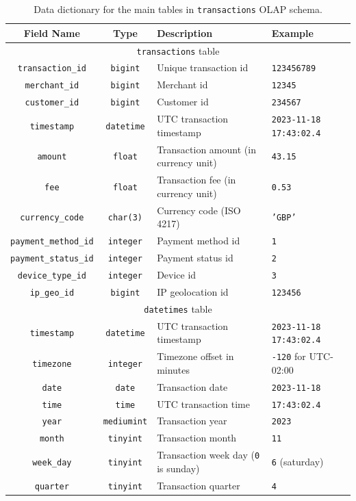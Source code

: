 \documentclass[11pt,a4paper,computermodern]{article}
\newcommand{\code}{\texttt}
\begin{document}
\begin{table}[ht]
	\centering
	\begin{threeparttable}
		\caption{Data dictionary for the main tables in \code{transactions} OLAP schema.}
		\label{table:OLAP_main}
		\begin{tabularx}{0.99\textwidth}{c c >{\centering\arraybackslash}X >{\centering\arraybackslash}X}
			\toprule
			Field Name & Type & Description & Example  \\
			\midrule
			\multicolumn{4}{c}{\code{transactions} table}\\
			\code{transaction\_id} & \code{bigint} & Unique transaction id & \code{123456789} \\
			\code{merchant\_id} & \code{bigint} & Merchant id & \code{12345} \\
			\code{customer\_id} & \code{bigint} & Customer id & \code{234567} \\
			\code{timestamp} & \code{datetime} & UTC transaction timestamp & \code{2023-11-18 17:43:02.4} \\
			\code{amount} & \code{float} & Transaction amount (in currency unit) & \code{43.15} \\
			\code{fee} & \code{float} & Transaction fee (in currency unit) & \code{0.53} \\
			\code{currency\_code} & \code{char(3)} & Currency code (ISO 4217) & \code{'GBP'} \\
			\code{payment\_method\_id} & \code{integer} & Payment method id & \code{1} \\
			\code{payment\_status\_id} & \code{integer} & Payment status id & \code{2} \\
			\code{device\_type\_id} & \code{integer} & Device id & \code{3} \\
			\code{ip\_geo\_id} & \code{bigint} & IP geolocation id & \code{123456} \\
			
			
			\midrule
			\multicolumn{4}{c}{\code{datetimes} table}\\
			\code{timestamp} & \code{datetime} & UTC transaction timestamp & \code{2023-11-18 17:43:02.4} \\
			\code{timezone} & \code{integer} & Timezone offset in minutes & \code{-120} for UTC-02:00 \\
			\code{date} & \code{date} & Transaction date & \code{2023-11-18} \\
			\code{time} & \code{time} & UTC transaction time & \code{17:43:02.4} \\
			\code{year} & \code{mediumint} & Transaction year & \code{2023} \\
			\code{month} & \code{tinyint} & Transaction month & \code{11} \\
			\code{week\_day} & \code{tinyint} & Transaction week day (\code{0} is sunday) & \code{6} (saturday) \\
			\code{quarter} & \code{tinyint} & Transaction quarter & \code{4} \\
			

\end{tabularx}
\end{threeparttable}
\end{table}
\end{document}
